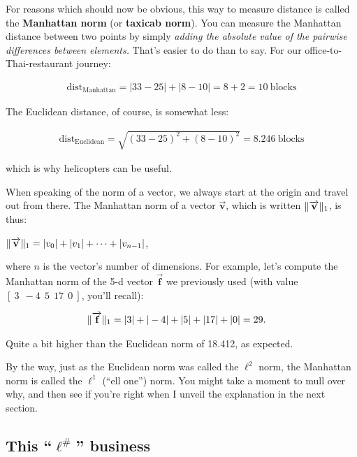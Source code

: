 For reasons which should now be obvious, this way to measure distance is called
the \textbf{Manhattan norm} (or \textbf{taxicab norm}). You can measure the
Manhattan distance between two points by simply \textit{adding the absolute
value of the pairwise differences between elements.} That's easier to do than
to say. For our office-to-Thai-restaurant journey:

\vspace{-.15in}
\begin{align*}
\textrm{dist}_\textrm{Manhattan} = |33-25| + |8-10| = 8 + 2 = 10\ 
\textrm{blocks}
\end{align*}

The Euclidean distance, of course, is somewhat less:

\vspace{-.15in}
\begin{align*}
\textrm{dist}_\textrm{Euclidean} = \sqrt{(33-25)^2 + (8-10)^2} = 8.246\ 
\textrm{blocks}
\end{align*}

which is why helicopters can be useful.

When speaking of the norm of a vector, we always start at the origin and travel
out from there. The Manhattan norm of a vector $\overrightarrow{\textbf{v}}$,
which is written $\lVert\overrightarrow{\textbf{v}}\rVert_1$, is thus: 

\begin{center}
$\lVert\overrightarrow{\textbf{v}}\rVert_1 = |v_0| + |v_1| + \cdots + |v_{n-1}|$,
\end{center}

where $n$ is the vector's number of dimensions. For example, let's compute the
Manhattan norm of the 5-d vector $\overrightarrow{\textbf{f}}$ we previously
used (with value $[\ 3\ \ -4\ \ 5\ \ 17\ \ 0\ ]$, you'll recall):

\vspace{-.15in}
\begin{align*}
\lVert\overrightarrow{\textbf{f}}\rVert_1 &= |3| + |-4| + |5| + |17| + |0| = 29.
\end{align*}

Quite a bit higher than the Euclidean norm of 18.412, as expected.

By the way, just as the Euclidean norm was called the $\ell^2$ norm, the
Manhattan norm is called the $\ell^1$ (``ell one'') norm. You might take a
moment to mull over why, and then see if you're right when I unveil the
explanation in the next section.

\subsection{This ``$\boldsymbol\ell^\textbf{\#}$'' business}

